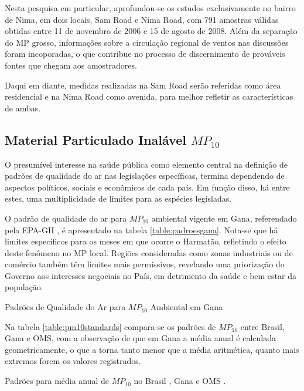 Nesta pesquisa em particular, aprofundou-se os estudos exclusivamente no bairro
de Nima, em dois locais, Sam Road e Nima Road, com 791 amostras válidas obtidas
entre 11 de novembro de 2006 e 15 de agosto de 2008. Além da separação do MP 
grosso, informações sobre a circulação regional de ventos nas discussões foram 
incoporadas, o que contribue no processo de discernimento de prováveis fontes 
que chegam aos amostradores.

Daqui em diante, medidas realizadas na Sam Road serão referidas como área 
residencial e na Nima Road como avenida, para melhor refletir as características
de ambas.

\newpage
\subsection{Material Particulado Inalável $MP_{10}$}

O presumível interesse na saúde pública como elemento central na definição de 
padrões de qualidade do ar nas legislações específicas, termina dependendo de
aspectos políticos, sociais e econômicos de cada país. Em função disso, há entre
estes, uma multiplicidade de limites para as espécies legisladas.

O padrão de qualidade do ar para $MP_{10}$ ambiental vigente em Gana, referendado
pela EPA-GH \citeyearpar{epa2015}, é apresentado na tabela 
\ref{table:padroesgana}. Nota-se que há limites específicos para os meses em que 
ocorre o Harmatão, refletindo o efeito deste fenômeno no MP local. 
Regiões consideradas como zonas industriais ou de comércio também têm limites 
mais permissivos, revelando uma priorização do Governo aos interesses negociais
no País, em detrimento da saúde e bem estar da população.

\begin{table}[H]
\centering
  
\caption{Padrões de Qualidade do Ar para $MP_{10}$ Ambiental em Gana
         \cite{epa2015} \label{table:padroesgana}}
\end{table}

Na tabela \ref{table:pm10standards} compara-se os padrões de $MP_{10}$ entre 
Brasil, Gana e OMS, com a observação de que em Gana a média anual é calculada 
geometricamente, o que a torna tanto menor que a média aritmética, quanto 
mais extremos forem os valores registrados.

\begin{table}[H]
\centering
  
  \caption{Padrões para média anual de $MP_{10}$ no Brasil \citep{conama1990}, 
           Gana \citep{epa2015} e OMS \citep{who}. \label{table:pm10standards}}
\end{table}


